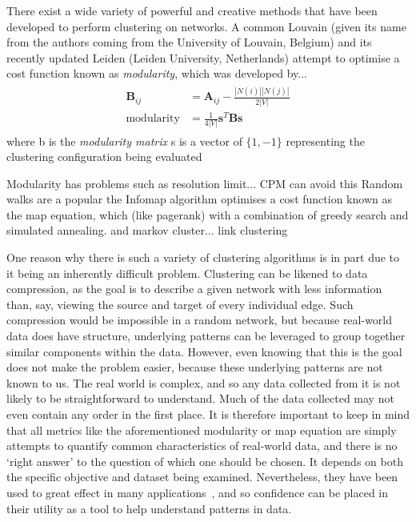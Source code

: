 There exist a wide variety of powerful and creative methods that have been developed to perform clustering on networks. A common 
Louvain (given its name from the authors coming from the University of Louvain, Belgium) and its recently updated Leiden (Leiden University, Netherlands) attempt to optimise a cost function known as \textit{modularity}, which was developed by...
\begin{align}
\begin{split}
    \mathbf{B}_{ij} &= \mathbf{A}_{ij} - \frac{|N(i)||N(j)|}{2|V|}\\
    \mathrm{modularity} &= \frac{1}{4|V|}\mathbf{s}^T\mathbf{Bs}
\end{split}
\label{eq:modularity}
\end{align}
where b is the \emph{modularity matrix} s is a vector of $\{1,-1\}$ representing the clustering configuration being evaluated

Modularity has problems such as resolution limit... CPM can avoid this
Random walks are a popular the Infomap algorithm optimises a cost function known as the map equation, which (like pagerank) with a combination of greedy search and simulated annealing.
and markov cluster...
link clustering

One reason why there is such a variety of clustering algorithms is in part due to it being an inherently difficult problem.
Clustering can be likened to data compression, as the goal is to describe a given network with less information than, say, viewing the source and target of every individual edge. Such compression would be impossible in a random network, but because real-world data does have structure, underlying patterns can be leveraged to group together similar components within the data.
However, even knowing that this is the goal does not make the problem easier, because these underlying patterns are not known to us. The real world is complex, and so any data collected from it is not likely to be straightforward to understand. Much of the data collected may not even contain any order in the first place.
It is therefore important to keep in mind that all metrics like the aforementioned modularity or map equation are simply attempts to quantify common characteristics of real-world data, and there is no `right answer' to the question of which one should be chosen. It depends on both the specific objective and dataset being examined. Nevertheless, they have been used to great effect in many applications~\cite{TODO}, and so confidence can be placed in their utility as a tool to help understand patterns in data.

